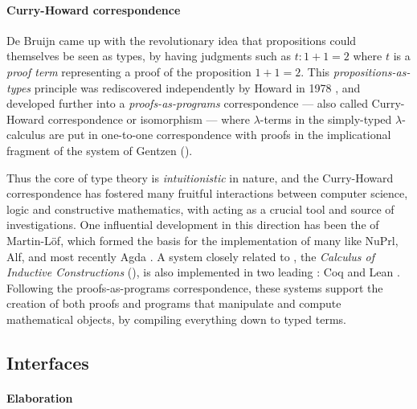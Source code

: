 \paragraph{Curry-Howard correspondence}

De Bruijn came up with the revolutionary idea that propositions could themselves
be seen as types, by having judgments such as $t : 1 + 1 = 2$ where $t$ is a
\emph{proof term} representing a proof of the proposition $1 + 1 = 2$. This
\emph{propositions-as-types} principle was rediscovered independently by Howard
in 1978 , and developed further into a
\emph{proofs-as-programs} correspondence --- also called Curry-Howard
correspondence or isomorphism --- where
$\lambda$-terms in the simply-typed $\lambda$-calculus are put in one-to-one
correspondence with proofs in the implicational fragment of the  system  of Gentzen ().

Thus the core of type theory is \emph{intuitionistic} in nature, and the
Curry-Howard correspondence has fostered many fruitful interactions between
computer science, logic and constructive mathematics, with 
acting as a crucial tool and source of investigations. One influential
development in this direction has been the  of
Martin-Löf, which formed the basis for the implementation of many  like NuPrl, Alf, and most recently Agda \cite{geuvers_proof_2009}. A
system closely related to , the \emph{Calculus of
Inductive Constructions} (), is also implemented in two leading : Coq  and Lean
. Following the proofs-as-programs
correspondence, these systems support the creation of both proofs and programs
that manipulate and compute mathematical objects, by compiling everything down
to typed terms.

\subsection{Interfaces}

\paragraph{Elaboration}

